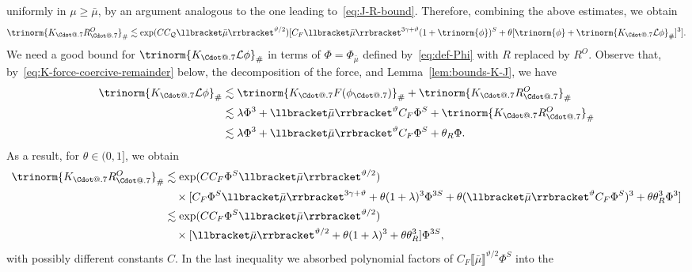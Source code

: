 \documentclass{article}
\makeatletter
\numberwithin{equation}{section}
\newcommand*\Cdot{{\mathpalette\Cdot@{.7}}}
\newcommand*\Cdot@[2]{\mathbin{\vcenter{\hbox{\scalebox{#2}{\hspace{0.1mm}$\m@th#1\bullet$\hspace{0.1mm}}}}}}
\theoremstyle{plain}
\theoremstyle{definition}
\makeatother
\begin{document}
uniformly in $\mu \geqslant \bar{\mu}$, by an argument analogous to the one
leading to~\eqref{eq:J-R-bound}. Therefore, combining the above estimates, we
obtain
\[ \trinorm{ K_{\Cdot} R^O_{\Cdot} }_{\#} \lesssim \exp (C
   C_{\mathcal{Q}} \llbracket \bar{\mu} \rrbracket^{\vartheta / 2})  [C_F 
   \llbracket \bar{\mu} \rrbracket^{3 \gamma + \vartheta}  (1 + \trinorm{
   \phi })^S + \theta [\trinorm{ \phi } + \trinorm{
   K_{\Cdot} \mathcal{L} \phi }_{\#}]^3] . \]
We need a good bound for $\trinorm{ K_{\Cdot} \mathcal{L} \phi
}_{\#}$ in terms of $\Phi = \Phi_{\bar{\mu}}$ defined
by~\eqref{eq:def-Phi} with $R$ replaced by $R^O$. Observe that,
by~\eqref{eq:K-force-coercive-remainder} below, the decomposition of the force, and
Lemma~\ref{lem:bounds-K-J}, we have
\begin{equation}
  \begin{aligned}
    \trinorm{ K_{\Cdot} \mathcal{L} \phi }_{\#} & \lesssim
    \trinorm{ K_{\Cdot} F (\phi_{\Cdot}) }_{\#} +
    \trinorm{ K_{\Cdot} R^O_{\Cdot} }_{\#}\\
    & \lesssim \lambda \Phi^3 + \llbracket \bar{\mu} \rrbracket^{\vartheta}
    C_F \Phi^S + \trinorm{ K_{\Cdot} R^O_{\Cdot} }_{\#}\\
    & \lesssim \lambda \Phi^3 + \llbracket \bar{\mu} \rrbracket^{\vartheta}
    C_F \Phi^S + \theta_R \Phi .
  \end{aligned} \label{eq:K-L-phi-O}
\end{equation}
As a result, for $\theta
\in (0, 1]$, we obtain
\begin{equation}
  \begin{aligned}
    \trinorm{ K_{\Cdot} R^O_{\Cdot} }_{\#}
    &\lesssim
    \exp (C C_F \Phi^S \llbracket \bar{\mu} \rrbracket^{\vartheta / 2})\\
    &\quad \times [C_F \Phi^S \llbracket \bar{\mu}
    \rrbracket^{3 \gamma + \vartheta} + \theta (1 + \lambda)^3 \Phi^{3S}
    + \theta (\llbracket \bar{\mu} \rrbracket^{\vartheta}
    C_F \Phi^S)^3
    + \theta \theta_R^3 \Phi^3]\\
    &\lesssim \exp (C C_F \Phi^S \llbracket \bar{\mu}
    \rrbracket^{\vartheta / 2})\\
    &\quad \times [\llbracket \bar{\mu} \rrbracket^{\vartheta / 2}
    + \theta (1 + \lambda)^3 + \theta \theta_R^3 ] \Phi^{3S},
  \end{aligned} \label{eq:bound-ro}
\end{equation}
with possibly different constants $C$. In the last inequality we absorbed
polynomial factors of
$C_F \llbracket \bar{\mu} \rrbracket^{\vartheta / 2} \Phi^S$ into the
\end{document}
